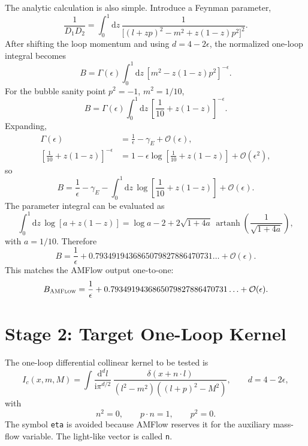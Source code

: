 \documentclass[11pt]{article}
\newcommand{\dd}{\mathrm{d}}
\newcommand{\ii}{\mathrm{i}}
\newcommand{\eps}{\epsilon}
\newcommand{\AMFlow}{\textsc{AMFlow}}
\newcommand{\WL}[1]{\texttt{#1}}
\begin{document}
The analytic calculation is also simple. Introduce a Feynman parameter,
\begin{equation}
  \frac{1}{D_1D_2}
  =
  \int_0^1 \dd z\,
  \frac{1}{\bigl[(l+zp)^2-m^2+z(1-z)p^2\bigr]^2}.
\end{equation}
After shifting the loop momentum and using \(d=4-2\eps\), the normalized
one-loop integral becomes
\begin{equation}
  B
  =
  \Gamma(\eps)
  \int_0^1\dd z\,
  \left[m^2-z(1-z)p^2\right]^{-\eps}.
\end{equation}
For the bubble sanity point \(p^2=-1\), \(m^2=1/10\),
\begin{equation}
  B
  =
  \Gamma(\eps)
  \int_0^1\dd z\,
  \left[\frac{1}{10}+z(1-z)\right]^{-\eps}.
\end{equation}
Expanding,
\begin{align}
  \Gamma(\eps)
  &=
  \frac{1}{\eps}-\gamma_E+\mathcal{O}(\eps),
  \\
  \left[\frac{1}{10}+z(1-z)\right]^{-\eps}
  &=
  1-\eps\log\!\left[\frac{1}{10}+z(1-z)\right]
  +\mathcal{O}(\eps^2),
\end{align}
so
\begin{equation}
  B
  =
  \frac{1}{\eps}
  -
  \gamma_E
  -
  \int_0^1\dd z\,
  \log\!\left[\frac{1}{10}+z(1-z)\right]
  +\mathcal{O}(\eps).
\end{equation}
The parameter integral can be evaluated as
\begin{equation}
  \int_0^1\dd z\,
  \log\!\left[a+z(1-z)\right]
  =
  \log a - 2
  +2\sqrt{1+4a}\,
  \operatorname{artanh}\!\left(\frac{1}{\sqrt{1+4a}}\right),
\end{equation}
with \(a=1/10\). Therefore
\begin{equation}
  B
  =
  \frac{1}{\eps}
  +0.7934919436865079827886470731\ldots
  +\mathcal{O}(\eps).
\end{equation}
This matches the AMFlow output one-to-one:
\begin{equation}
  B_{\AMFlow}
  =
  \frac{1}{\eps}
  +0.7934919436865079827886470731\ldots
  +\mathcal{O}(\eps).
\end{equation}

\section{Stage 2: Target One-Loop Kernel}

The one-loop differential collinear kernel to be tested is
\begin{equation}
  I_c(x,m,M)
  =
  \int \frac{\dd^d l}{\ii \pi^{d/2}}\,
  \frac{\delta(x+n\cdot l)}
       {(l^2-m^2)((l+p)^2-M^2)},
  \qquad d=4-2\eps ,
\end{equation}
with
\begin{equation}
  n^2=0,\qquad p\cdot n=1,\qquad p^2=0.
\end{equation}
The symbol \WL{eta} is avoided because AMFlow reserves it for the auxiliary
mass-flow variable. The light-like vector is called \WL{n}.
\end{document}
